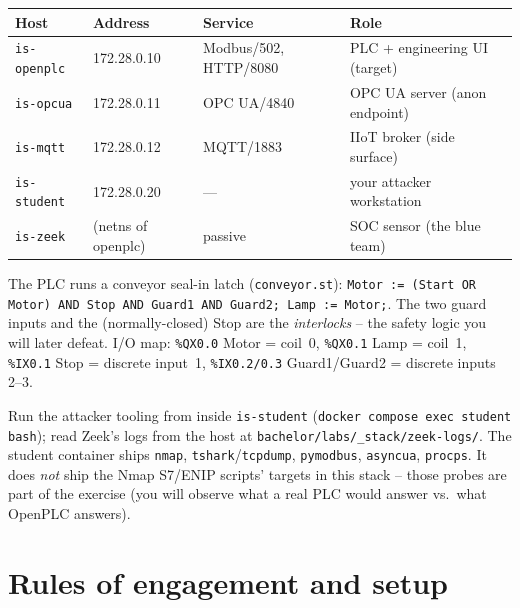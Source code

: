 \documentclass[11pt,a4paper]{article}
\begin{document}
\begin{center}
\small
\begin{tabular}{@{}p{3.3cm}p{3.0cm}p{3.0cm}p{4.0cm}@{}}
\toprule
\textbf{Host} & \textbf{Address} & \textbf{Service} & \textbf{Role} \\
\midrule
\texttt{is-openplc} & 172.28.0.10 & Modbus/502, HTTP/8080 & PLC + engineering UI (target) \\
\texttt{is-opcua}   & 172.28.0.11 & OPC UA/4840           & OPC UA server (anon endpoint) \\
\texttt{is-mqtt}    & 172.28.0.12 & MQTT/1883             & IIoT broker (side surface) \\
\texttt{is-student} & 172.28.0.20 & ---                   & your attacker workstation \\
\texttt{is-zeek}    & (netns of openplc) & passive       & SOC sensor (the blue team) \\
\bottomrule
\end{tabular}
\end{center}

The PLC runs a conveyor seal-in latch (\texttt{conveyor.st}):
\texttt{Motor := (Start OR Motor) AND Stop AND Guard1 AND Guard2; Lamp
:= Motor;}. The two guard inputs and the (normally-closed) Stop are the
\emph{interlocks} -- the safety logic you will later defeat. I/O map:
\texttt{\%QX0.0} Motor = coil~0, \texttt{\%QX0.1} Lamp = coil~1,
\texttt{\%IX0.1} Stop = discrete input~1, \texttt{\%IX0.2/0.3}
Guard1/Guard2 = discrete inputs 2--3.

\begin{notebox}
Run the attacker tooling from inside \texttt{is-student}
(\texttt{docker compose exec student bash}); read Zeek's logs from the
host at \texttt{bachelor/labs/\_stack/zeek-logs/}. The student container
ships \texttt{nmap}, \texttt{tshark}/\texttt{tcpdump},
\texttt{pymodbus}, \texttt{asyncua}, \texttt{procps}. It does
\emph{not} ship the Nmap S7/ENIP scripts' targets in this stack -- those
probes are part of the exercise (you will observe what a real PLC would
answer vs.\ what OpenPLC answers).
\end{notebox}

\section*{Rules of engagement and setup}
\end{document}
